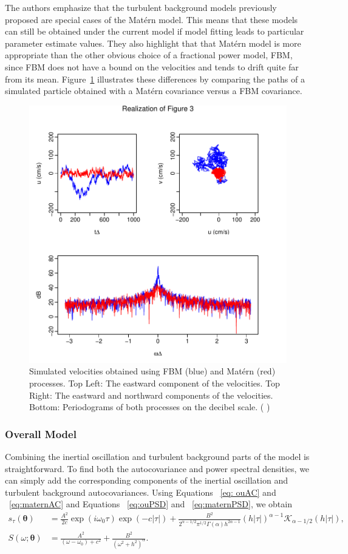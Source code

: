 \documentclass{stat572Style}
\newcommand{\vmcomment}[1]{({\color{blue}{VM's comment:}} \textbf{\color{blue}{#1}})}
\begin{document}
The authors emphasize that the turbulent background models previously proposed are special cases of the Mat\'{e}rn model. 
This means that these models can still be obtained under the current model if model fitting leads to particular parameter estimate values. 
They also highlight that that Mat\'{e}rn model is more appropriate than the other obvious choice of a fractional power model, FBM, since FBM does not have a bound on the velocities and tends to drift quite far from its mean.
 Figure~\ref{fig: fmbMat} illustrates these differences by comparing the paths of a simulated particle obtained with a Mat\'{e}rn  covariance versus a FBM covariance. 

\begin{figure}[h!]
  \centering
    \includegraphics[width=.7\textwidth]{ReplicatedFigures/fig3.pdf}
        \caption{Simulated velocities obtained using FBM (blue) and Mat\'{e}rn (red)  processes. Top Left: The eastward component of the velocities. Top Right: The eastward and northward components of the velocities. Bottom: Periodograms of both processes on the decibel scale. \vmcomment{I would include legends or direct labeling for all your figures.}}
        	\label{fig: fmbMat}
\end{figure}

\subsubsection{Overall Model}
Combining the inertial oscillation and turbulent background parts of the model is straightforward.
 To find both the autocovariance and power spectral densities, we can simply add the corresponding components of the inertial oscillation and turbulent background autocovariances. 
 Using Equations ~\ref{eq: ouAC} and ~\ref{eq:maternAC} and Equations ~\ref{eq:ouPSD} and ~\ref{eq:maternPSD}, we obtain
\begin{align}
\label{eq: fullSpec}
s_{\tau}(\boldsymbol{\theta}) &= \frac{A^{2}}{2c} \exp(i \omega_{0}\tau) \exp(-c|\tau|) +  \frac{B^{2}}{2^{\alpha - 1/2}\pi^{1/2} \Gamma(\alpha) h^{2 \alpha - 1}}(h|\tau|)^{\alpha - 1}\mathcal{K}_{\alpha - 1/2}(h|\tau|)
,\\
S(\omega; \boldsymbol{\theta}) &= \frac{A^{2}}{(\omega - \omega_{0}) + c^{2}} + \frac{B^{2}}{(\omega^{2} + h^{2})^{\alpha}}.
\end{align}
\end{document}
